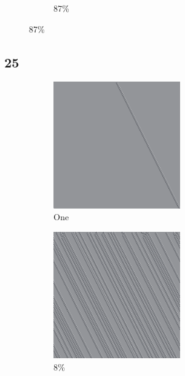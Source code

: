 \documentclass[12pt, fleqn]{report}                             %
\theoremstyle{break}                                            %
\begin{document}
\begin{figure}[ht!]
\begin{subfigure}[b]{0.4\linewidth}
          \caption{87\%}
        \end{subfigure}
      \end{figure}


      \clearpage
      \subsection{25}
      \begin{figure}[ht!]
        \centering
        \begin{subfigure}[b]{0.4\linewidth}
          \includegraphics[width=0.6\textwidth]{Images/25/a.png}
          \caption{One}
        \end{subfigure}
        \begin{subfigure}[b]{0.4\linewidth}
          \includegraphics[width=0.6\textwidth]{Images/25/b.png}
          \caption{8\%}
        \end{subfigure}
        \begin{subfigure}[b]{0.4\linewidth}

\end{subfigure}
\end{figure}
\end{document}
